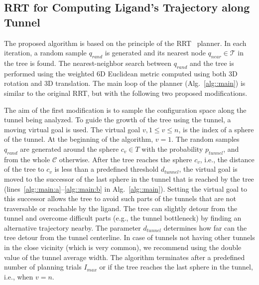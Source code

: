 \documentclass[usletter, 10pt, conference]{ieeeconf} %
\def\qrand{q_{rand}}
\def\qnear{q_{near}}
\def\T{\mathcal{T}}
\def\C{\mathcal{C}}
\def\dt{d_{tunnel}}
\def\Imax{I_{max}} %
\def\gb{p_{tunnel}}
\begin{document}
\subsection{RRT for Computing Ligand's Trajectory along Tunnel}

The proposed algorithm is based on the principle of the RRT~\cite{lavalleRRT} planner.
In each iteration, a random sample $\qrand$ is generated and its nearest node $\qnear\in\T$ in the tree is found.
The nearest-neighbor search between $\qrand$ and the tree is performed using the weighted 6D Euclidean metric computed using
both 3D rotation and 3D translation.
The main loop of the planner (Alg.~\ref{alg::main}) is similar to the original RRT, but with the following two proposed modifications.

The aim of the first modification is to sample the configuration space along the tunnel being analyzed.
To guide the growth of the tree using the tunnel, a moving virtual goal is used. %
The virtual goal $v, 1\le v \le n$, is the index of a sphere of the tunnel.
At the beginning of the algorithm, $v=1$.
The random samples $\qrand$ are generated around the sphere $c_v \in T$ with the probability $\gb$, and from the whole $\C$ otherwise.
After the tree reaches the sphere $c_v$, i.e., the distance of the tree to $c_v$ is
less than a predefined threshold $\dt$, the virtual goal is moved to the successor of the last sphere in the tunnel
that is reached by the tree (lines~\ref{alg::main:a}--\ref{alg::main:b} in Alg.~\ref{alg::main}).
Setting the virtual goal to this successor allows the tree to avoid such parts of the tunnels that are not traversable or reachable by the ligand.
The tree can slightly detour from the tunnel and overcome difficult parts (e.g., the tunnel bottleneck) by finding an alternative trajectory nearby.
The parameter $\dt$ determines how far can the tree detour from the tunnel centerline.
In case of tunnels not having other tunnels in the close vicinity (which is very common), we recommend using the double value of the tunnel average width.
The algorithm terminates after a predefined number of planning trials $\Imax$ or if the tree reaches
the last sphere in the tunnel, i.e., when $v = n$.

\end{document}
